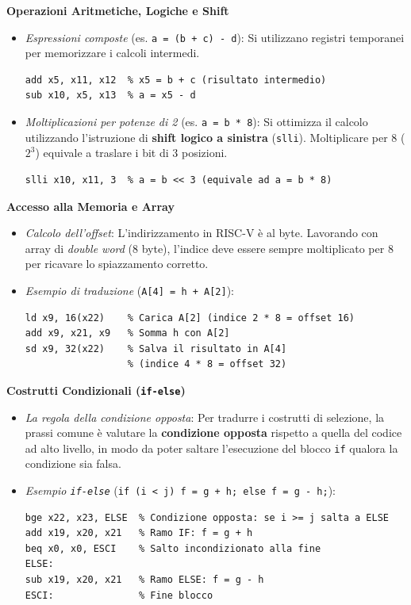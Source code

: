 \documentclass[12pt, a4paper]{article}
\begin{document}
\textbf{Operazioni Aritmetiche, Logiche e Shift}
\begin{itemize}
    \item \textit{Espressioni composte} (es. \texttt{a = (b + c) - d}): Si utilizzano registri temporanei per memorizzare i calcoli intermedi.
\begin{verbatim}
add x5, x11, x12  % x5 = b + c (risultato intermedio)
sub x10, x5, x13  % a = x5 - d
\end{verbatim}
    \item \textit{Moltiplicazioni per potenze di 2} (es. \texttt{a = b * 8}): Si ottimizza il calcolo utilizzando l'istruzione di \textbf{shift logico a sinistra} (\texttt{slli}). Moltiplicare per $8$ ($2^3$) equivale a traslare i bit di 3 posizioni.
\begin{verbatim}
slli x10, x11, 3  % a = b << 3 (equivale ad a = b * 8)
\end{verbatim}
\end{itemize}

\textbf{Accesso alla Memoria e Array}
\begin{itemize}
    \item \textit{Calcolo dell'offset}: L'indirizzamento in RISC-V è al byte. Lavorando con array di \textit{double word} (8 byte), l'indice deve essere sempre moltiplicato per 8 per ricavare lo spiazzamento corretto.
    \item \textit{Esempio di traduzione} (\texttt{A[4] = h + A[2]}):
\begin{verbatim}
ld x9, 16(x22)    % Carica A[2] (indice 2 * 8 = offset 16)
add x9, x21, x9   % Somma h con A[2]
sd x9, 32(x22)    % Salva il risultato in A[4] 
                  % (indice 4 * 8 = offset 32)
\end{verbatim}
\end{itemize}

\textbf{Costrutti Condizionali (\texttt{if-else})}
\begin{itemize}
    \item \textit{La regola della condizione opposta}: Per tradurre i costrutti di selezione, la prassi comune è valutare la \textbf{condizione opposta} rispetto a quella del codice ad alto livello, in modo da poter saltare l'esecuzione del blocco \texttt{if} qualora la condizione sia falsa.
    \item \textit{Esempio \texttt{if-else}} (\texttt{if (i < j) f = g + h; else f = g - h;}):
\begin{verbatim}
bge x22, x23, ELSE  % Condizione opposta: se i >= j salta a ELSE
add x19, x20, x21   % Ramo IF: f = g + h
beq x0, x0, ESCI    % Salto incondizionato alla fine
ELSE:
sub x19, x20, x21   % Ramo ELSE: f = g - h
ESCI:               % Fine blocco
\end{verbatim}
\end{itemize}
\end{document}
